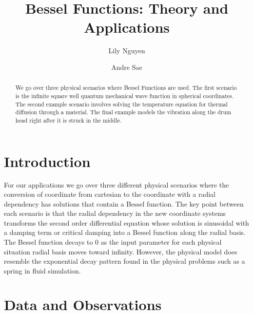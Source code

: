 \documentclass[linenumbers, RNAAS, trackchanges]{aastex631}
\begin{document}
\title{Bessel Functions: Theory and Applications}
\author{Lily Nguyen}

\author{Andre Sae}


\begin{abstract}

We go over three physical scenarios where Bessel Functions are used. The first 
scenario is the infinite square well quantum mechanical wave function in 
spherical coordinates. The second example scenario involves solving the 
temperature equation for thermal diffusion through a material. The final 
example models the vibration along the drum head right after it is struck in 
the middle. 

\end{abstract}



\section{Introduction} \label{sec:intro}


For our applications we go over three different physical scenarios where the
conversion of coordinate from cartesian to the coordinate with a radial 
dependency has solutions that contain a Bessel function. The key point between 
each scenario is that the radial dependency in the new coordinate systems 
transforms the second order differential equation whose solution is sinusoidal 
with a damping term or critical damping  into a Bessel function along the radial 
basis. The Bessel function decays to 0 as the input parameter for each physical 
situation radial basis moves toward infinity. However, the physical model does 
resemble the exponential decay pattern found in the physical problems such as a 
spring in fluid simulation.



\section{Data and Observations} \label{sec:data}
\end{document}
